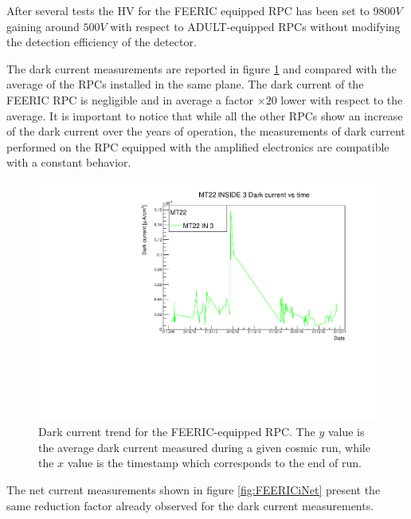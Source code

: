 After several tests the HV for the FEERIC equipped RPC has been set to $9800V$ gaining around $500V$ with respect to ADULT-equipped RPCs without modifying the detection efficiency of the detector.

The dark current measurements are reported in figure \ref{fig:FEERICiDark} and compared with the average of the RPCs installed in the same plane.
The dark current of the FEERIC RPC is negligible and in average a factor $\times20$ lower with respect to the average.
It is important to notice that while all the other RPCs show an increase of the dark current over the years of operation, the measurements of dark current performed on the RPC equipped with the amplified electronics are compatible with a constant behavior.

\begin{figure}[!t]
\begin{center}
\includegraphics[width=0.7\linewidth]{Chapters/Performance/Figs/iDarkFEERIC.pdf}
\caption{Dark current trend for the FEERIC-equipped RPC. The $y$ value is the average dark current measured during a given cosmic run, while the $x$ value is the timestamp which corresponds to the end of run.}
\label{fig:FEERICiDark}
\end{center}
\end{figure}

The net current measurements shown in figure \ref{fig:FEERICiNet} present the same reduction factor already observed for the dark current measurements.

